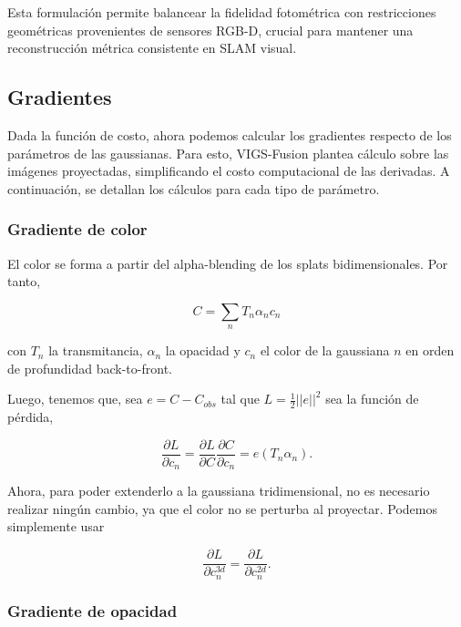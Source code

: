 Esta formulación permite balancear la fidelidad fotométrica con restricciones geométricas provenientes de sensores RGB-D, crucial para mantener una reconstrucción métrica consistente en SLAM visual.




\subsection{Gradientes}

Dada la función de costo, ahora podemos calcular los gradientes respecto de los parámetros de las gaussianas. Para esto, VIGS-Fusion plantea cálculo sobre las imágenes proyectadas, simplificando el costo computacional de las derivadas. A continuación, se detallan los cálculos para cada tipo de parámetro.

\subsubsection{Gradiente de color}

El color se forma a partir del alpha-blending de los splats bidimensionales. Por tanto,

\begin{equation}
C = \sum_n T_n \alpha_n c_n
\end{equation}

\noindent con $T_n$ la transmitancia, $\alpha_n$ la opacidad y $c_n$ el color de la gaussiana $n$ en orden de profundidad back-to-front.

Luego, tenemos que, sea $e = C - C_{obs}$ tal que $L = \frac{1}{2}||e||^2$ sea la función de pérdida,

\begin{equation}
    \frac{\partial L}{\partial c_n} = 
    \frac{\partial L}{\partial C} \frac{\partial C}{\partial c_n} =
    e (T_n\alpha_n).
\end{equation}

Ahora, para poder extenderlo a la gaussiana tridimensional, no es necesario realizar ningún cambio, ya que el color no se perturba al proyectar. Podemos simplemente usar

\begin{equation}
    \frac{\partial L}{\partial c_n^{3d}} = \frac{\partial L}{\partial c_n^{2d}}.
\end{equation}



\subsubsection{Gradiente de opacidad}

